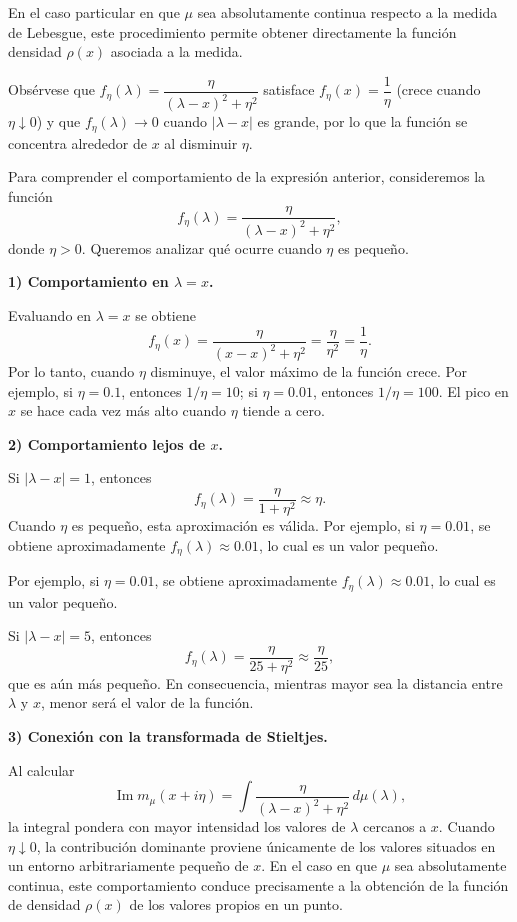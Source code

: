 \documentclass[letterpaper,12pt,oneside]{book}
\begin{document}
En el caso particular en que $\mu$ sea absolutamente continua respecto a la medida de Lebesgue, este procedimiento permite obtener directamente la función densidad $\rho(x)$ asociada a la medida.

Obsérvese que $f_\eta(\lambda)=\dfrac{\eta}{(\lambda-x)^2+\eta^2}$ satisface $f_\eta(x)=\dfrac{1}{\eta}$ (crece cuando $\eta\downarrow0$) y que $f_\eta(\lambda)\to0$ cuando $|\lambda-x|$ es grande, por lo que la función se concentra alrededor de $x$ al disminuir $\eta$.

Para comprender el comportamiento de la expresión anterior, consideremos la función
\[
f_\eta(\lambda)
=
\frac{\eta}{(\lambda-x)^2+\eta^2},
\]
donde $\eta>0$. Queremos analizar qué ocurre cuando $\eta$ es pequeño.

\medskip

\noindent
\textbf{1) Comportamiento en $\lambda = x$.}

Evaluando en $\lambda=x$ se obtiene
\[
f_\eta(x)
=
\frac{\eta}{(x-x)^2+\eta^2}
=
\frac{\eta}{\eta^2}
=
\frac{1}{\eta}.
\]
Por lo tanto, cuando $\eta$ disminuye, el valor máximo de la función crece. Por ejemplo, si $\eta=0.1$, entonces $1/\eta=10$; si $\eta=0.01$, entonces $1/\eta=100$. El pico en $x$ se hace cada vez más alto cuando $\eta$ tiende a cero.

\medskip

\noindent
\textbf{2) Comportamiento lejos de $x$.}

Si $|\lambda-x|=1$, entonces
\[
f_\eta(\lambda)
=
\frac{\eta}{1+\eta^2}
\approx \eta.
\]
Cuando $\eta$ es pequeño, esta aproximación es válida.
Por ejemplo, si $\eta=0.01$, se obtiene aproximadamente 
$f_\eta(\lambda)\approx 0.01$, lo cual es un valor pequeño.

Por ejemplo, si $\eta=0.01$, se obtiene aproximadamente $f_\eta(\lambda)\approx0.01$,
lo cual es un valor pequeño.

Si $|\lambda-x|=5$, entonces
\[
f_\eta(\lambda)
=
\frac{\eta}{25+\eta^2}
\approx \frac{\eta}{25},
\]
que es aún más pequeño. En consecuencia, mientras mayor sea la distancia entre $\lambda$ y $x$, menor será el valor de la función.

\medskip

\noindent
\textbf{3) Conexión con la transformada de Stieltjes.}

Al calcular
\[
\operatorname{Im} m_\mu(x+i\eta)
=
\int
\frac{\eta}{(\lambda-x)^2+\eta^2}\, d\mu(\lambda),
\]
la integral pondera con mayor intensidad los valores de $\lambda$ cercanos a $x$. Cuando $\eta \downarrow 0$, la contribución dominante proviene únicamente de los valores situados en un entorno arbitrariamente pequeño de $x$. En el caso en que $\mu$ sea absolutamente continua, este comportamiento conduce precisamente a la obtención de la función de densidad $\rho(x)$ de los valores propios en un punto.
\end{document}
